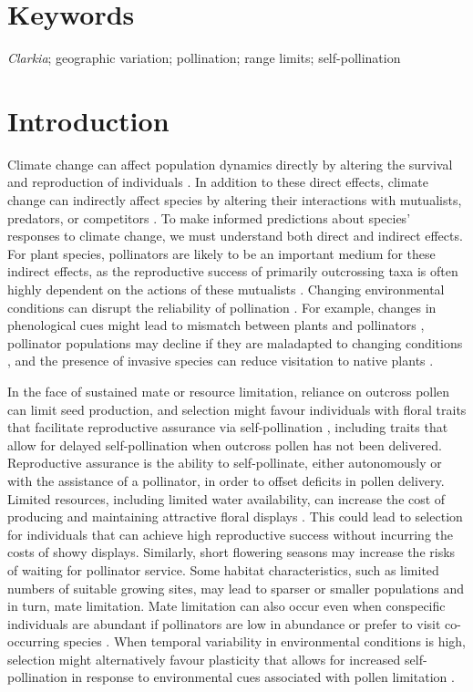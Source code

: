 \documentclass{article}
\begin{document}
\section*{Keywords}
\textit{Clarkia}; geographic variation; pollination; range limits; self-pollination

\section*{Introduction}

Climate change can affect population dynamics directly by altering the survival and reproduction of individuals \citep{mcgraw2015northward}. In addition to these direct effects, climate change can indirectly affect species by altering their interactions with mutualists, predators, or competitors \citep{miller2015functional}. To make informed predictions about species' responses to climate change, we must understand both direct and indirect effects. For plant species, pollinators are likely to be an important medium for these indirect effects, as the reproductive success of primarily outcrossing taxa is often highly dependent on the actions of these mutualists \citep{burd1994principle, ashman2004pollen}. Changing environmental conditions can disrupt the reliability of pollination \citep{kudo2004does}. For example, changes in phenological cues might lead to mismatch between plants and pollinators \citep{kudo2013early}, pollinator populations may decline if they are maladapted to changing conditions \citep{williams2007vulnerability}, and the presence of invasive species can reduce visitation to native plants \citep{bjerknes2007alien, bruckman2016pollination}.  

In the face of sustained mate or resource limitation, reliance on outcross pollen can limit seed production, and selection might favour individuals with floral traits that facilitate reproductive assurance via self-pollination \citep{bodbyl2011rapid}, including traits that allow for delayed self-pollination when outcross pollen has not been delivered. Reproductive assurance is the ability to self-pollinate, either autonomously or with the assistance of a pollinator, in order to offset deficits in pollen delivery. Limited resources, including limited water availability, can increase the cost of producing and maintaining attractive floral displays \citep{galen1999flowers}. This could lead to selection for individuals that can achieve high reproductive success without incurring the costs of showy displays. Similarly, short flowering seasons may increase the risks of waiting for pollinator service. Some habitat characteristics, such as limited numbers of suitable growing sites, may lead to sparser or smaller populations and in turn, mate limitation. Mate limitation can also occur even when conspecific individuals are abundant if pollinators are low in abundance or prefer to visit co-occurring species \citep{knight2005pollen}. When temporal variability in environmental conditions is high, selection might alternatively favour plasticity that allows for increased self-pollination in response to environmental cues associated with pollen limitation \citep{kay2013drought}. 
\end{document}
